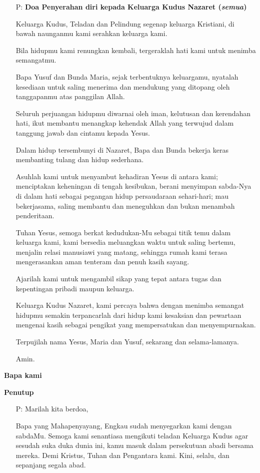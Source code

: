 \documentclass[a5paper,12pt,openany]{scrbook}
\makeatletter
\newcommand{\subjudul}[1]{%
  {\parindent \z@ \normalfont
    \interlinepenalty\@M \bfseries #1\par\nobreak \vskip 20\p@ }}
\newcommand{\BI}[1]{\begin{itemize} \item[P:] #1 \end{itemize}}
\newcommand{\BP}[1]{\begin{itemize} \item[P:] #1 \end{itemize}}
\makeatother
\begin{document}
\BP{\textbf{Doa Penyerahan diri kepada Keluarga Kudus Nazaret (\textit{semua})}

Keluarga Kudus, Teladan dan Pelindung segenap keluarga Kristiani,
di bawah naunganmu kami serahkan keluarga kami.

Bila hidupmu kami renungkan kembali,
tergeraklah hati kami untuk menimba semangatmu.

Bapa Yusuf dan Bunda Maria, sejak terbentuknya keluargamu,
nyatalah kesediaan untuk saling menerima dan mendukung
yang ditopang oleh tanggapanmu atas panggilan Allah.

Seluruh perjuangan hidupmu diwarnai oleh iman, kelutusan dan kerendahan hati,
ikut membantu menangkap kehendak Allah
yang terwujud dalam tanggung jawab dan cintamu kepada Yesus.

Dalam hidup tersembunyi di Nazaret, Bapa dan Bunda bekerja keras
membanting tulang dan hidup sederhana.

Asuhlah kami untuk menyambut kehadiran Yesus di antara kami;
menciptakan keheningan di tengah kesibukan,
berani menyimpan sabda-Nya di dalam hati
sebagai pegangan hidup persaudaraan sehari-hari;
mau bekerjasama, saling membantu dan meneguhkan dan bukan menambah penderitaan.

Tuhan Yesus, semoga berkat kedudukan-Mu sebagai titik temu dalam keluarga kami,
kami bersedia meluangkan waktu untuk saling bertemu,
menjalin relasi manusiawi yang matang,
sehingga rumah kami terasa mengerasankan aman tenteram dan penuh kasih sayang.

Ajarilah kami untuk mengambil sikap yang tepat
antara tugas dan kepentingan pribadi maupun keluarga.

Keluarga Kudus Nazaret, kami percaya bahwa dengan menimba semangat hidupmu
semakin terpancarlah dari hidup kami
kesaksian dan pewartaan mengenai kasih sebagai pengikat
yang mempersatukan dan menyempurnakan.

Terpujilah nama Yesus, Maria dan Yusuf,
sekarang dan selama-lamanya.

Amin.}

\subjudul{Bapa kami}

\subjudul{Penutup}
\BI{Marilah kita berdoa,

Bapa yang Mahapenyayang, Engkau sudah menyegarkan kami dengan sabdaMu. Semoga kami senantiasa mengikuti teladan Keluarga Kudus agar sesudah suka duka dunia ini, kamu masuk dalam persekutuan abadi bersama mereka.
Demi Kristus, Tuhan dan Pengantara kami. Kini, selalu, dan sepanjang segala abad.}
\end{document}
